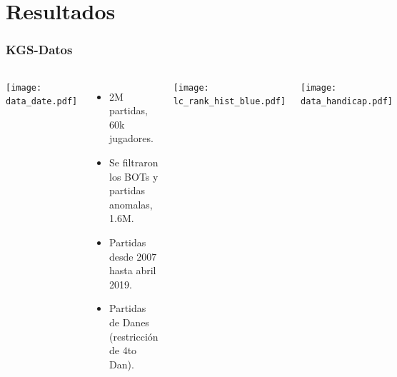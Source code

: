 \documentclass{beamer}
\begin{document}
\section{Resultados}
\begin{frame}
\frametitle{KGS-Datos}

\begin{columns}
\begin{minipage}[c][0.4\textheight][c]{\linewidth}
  \centering
  \texttt{[image: data\_date.pdf]}
\end{minipage}
\begin{minipage}[c][0.4\textheight][c]{\linewidth}
    \begin{itemize}
     \item 2M partidas, 60k jugadores.
     \item Se filtraron los BOTs y partidas anomalas, 1.6M.
     \item Partidas desde 2007 hasta abril 2019.
     \item Partidas de Danes (restricci\'on de 4to Dan).
    \end{itemize}

\end{minipage}
\begin{minipage}[c][0.4\textheight][c]{\linewidth}
  \centering
  \texttt{[image: lc\_rank\_hist\_blue.pdf]}
\end{minipage}
\begin{minipage}[c][0.4\textheight][c]{\linewidth}
  \centering
  \texttt{[image: data\_handicap.pdf]}
\end{minipage}
\end{columns}

\end{frame}
\end{document}
